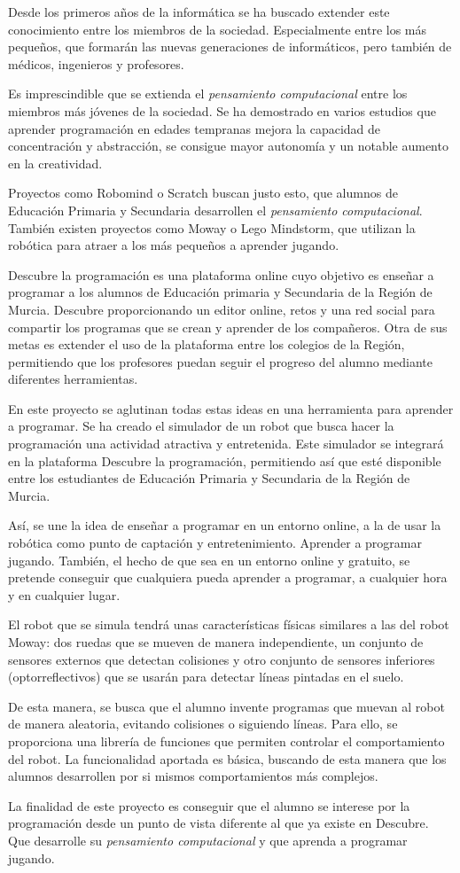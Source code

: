 Desde los primeros años de la informática se ha buscado extender este conocimiento entre los miembros de la sociedad. Especialmente entre los más pequeños, que formarán las nuevas generaciones de informáticos, pero también de médicos, ingenieros y profesores. 

Es imprescindible que se extienda el \emph{pensamiento computacional} entre los miembros más jóvenes de la sociedad. Se ha demostrado en varios estudios que aprender programación en edades tempranas mejora la capacidad de concentración y abstracción, se consigue mayor autonomía y un notable aumento en la creatividad.

Proyectos como Robomind o Scratch buscan justo esto, que alumnos de Educación Primaria y Secundaria desarrollen el \emph{pensamiento computacional}. También existen proyectos como Moway o Lego Mindstorm, que utilizan la robótica para atraer a los más pequeños a aprender jugando. 

Descubre la programación es una plataforma online cuyo objetivo es enseñar a programar a los alumnos de Educación primaria y Secundaria de la Región de Murcia. Descubre proporcionando un editor online, retos y una red social para compartir los programas que se crean y aprender de los compañeros. Otra de sus metas es extender el uso de la plataforma entre los colegios de la Región, permitiendo que los profesores puedan seguir el progreso del alumno mediante diferentes herramientas.

En este proyecto se aglutinan todas estas ideas en una herramienta para aprender a programar. Se ha creado el simulador de un robot que busca hacer la programación una actividad atractiva y entretenida. Este simulador se integrará en la plataforma Descubre la programación, permitiendo así que esté disponible entre los estudiantes de Educación Primaria y Secundaria de la Región de Murcia.

Así, se une la idea de enseñar a programar en un entorno online, a la de usar la robótica como punto de captación y entretenimiento. Aprender a programar jugando. También, el hecho de que sea en un entorno online y gratuito, se pretende conseguir que cualquiera pueda aprender a programar, a cualquier hora y en cualquier lugar.


El robot que se simula tendrá unas características físicas similares a las del robot Moway: dos ruedas que se mueven de manera independiente, un conjunto de sensores externos que detectan colisiones y otro conjunto de sensores inferiores (optorreflectivos) que se usarán para detectar líneas pintadas en el suelo.

De esta manera, se busca que el alumno invente programas que muevan al robot de manera aleatoria, evitando colisiones o siguiendo líneas. Para ello, se proporciona una librería de funciones que permiten controlar el comportamiento del robot. La funcionalidad aportada es básica, buscando de esta manera que los alumnos desarrollen por si mismos comportamientos más complejos.

La finalidad de este proyecto es conseguir que el alumno se interese por la programación desde un punto de vista diferente al que ya existe en Descubre. Que desarrolle su \emph{pensamiento computacional} y que aprenda a programar jugando.


